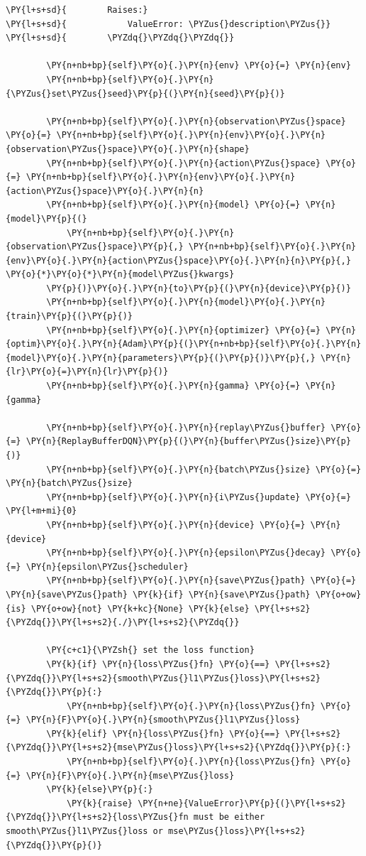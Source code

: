 \documentclass{article}
\begin{document}
\begin{Verbatim}[commandchars=\\\{\}]
\PY{l+s+sd}{        Raises:}
\PY{l+s+sd}{            ValueError: \PYZus{}description\PYZus{}}
\PY{l+s+sd}{        \PYZdq{}\PYZdq{}\PYZdq{}}

        \PY{n+nb+bp}{self}\PY{o}{.}\PY{n}{env} \PY{o}{=} \PY{n}{env}
        \PY{n+nb+bp}{self}\PY{o}{.}\PY{n}{\PYZus{}set\PYZus{}seed}\PY{p}{(}\PY{n}{seed}\PY{p}{)}

        \PY{n+nb+bp}{self}\PY{o}{.}\PY{n}{observation\PYZus{}space} \PY{o}{=} \PY{n+nb+bp}{self}\PY{o}{.}\PY{n}{env}\PY{o}{.}\PY{n}{observation\PYZus{}space}\PY{o}{.}\PY{n}{shape}
        \PY{n+nb+bp}{self}\PY{o}{.}\PY{n}{action\PYZus{}space} \PY{o}{=} \PY{n+nb+bp}{self}\PY{o}{.}\PY{n}{env}\PY{o}{.}\PY{n}{action\PYZus{}space}\PY{o}{.}\PY{n}{n}
        \PY{n+nb+bp}{self}\PY{o}{.}\PY{n}{model} \PY{o}{=} \PY{n}{model}\PY{p}{(}
            \PY{n+nb+bp}{self}\PY{o}{.}\PY{n}{observation\PYZus{}space}\PY{p}{,} \PY{n+nb+bp}{self}\PY{o}{.}\PY{n}{env}\PY{o}{.}\PY{n}{action\PYZus{}space}\PY{o}{.}\PY{n}{n}\PY{p}{,} \PY{o}{*}\PY{o}{*}\PY{n}{model\PYZus{}kwargs}
        \PY{p}{)}\PY{o}{.}\PY{n}{to}\PY{p}{(}\PY{n}{device}\PY{p}{)}
        \PY{n+nb+bp}{self}\PY{o}{.}\PY{n}{model}\PY{o}{.}\PY{n}{train}\PY{p}{(}\PY{p}{)}
        \PY{n+nb+bp}{self}\PY{o}{.}\PY{n}{optimizer} \PY{o}{=} \PY{n}{optim}\PY{o}{.}\PY{n}{Adam}\PY{p}{(}\PY{n+nb+bp}{self}\PY{o}{.}\PY{n}{model}\PY{o}{.}\PY{n}{parameters}\PY{p}{(}\PY{p}{)}\PY{p}{,} \PY{n}{lr}\PY{o}{=}\PY{n}{lr}\PY{p}{)}
        \PY{n+nb+bp}{self}\PY{o}{.}\PY{n}{gamma} \PY{o}{=} \PY{n}{gamma}

        \PY{n+nb+bp}{self}\PY{o}{.}\PY{n}{replay\PYZus{}buffer} \PY{o}{=} \PY{n}{ReplayBufferDQN}\PY{p}{(}\PY{n}{buffer\PYZus{}size}\PY{p}{)}
        \PY{n+nb+bp}{self}\PY{o}{.}\PY{n}{batch\PYZus{}size} \PY{o}{=} \PY{n}{batch\PYZus{}size}
        \PY{n+nb+bp}{self}\PY{o}{.}\PY{n}{i\PYZus{}update} \PY{o}{=} \PY{l+m+mi}{0}
        \PY{n+nb+bp}{self}\PY{o}{.}\PY{n}{device} \PY{o}{=} \PY{n}{device}
        \PY{n+nb+bp}{self}\PY{o}{.}\PY{n}{epsilon\PYZus{}decay} \PY{o}{=} \PY{n}{epsilon\PYZus{}scheduler}
        \PY{n+nb+bp}{self}\PY{o}{.}\PY{n}{save\PYZus{}path} \PY{o}{=} \PY{n}{save\PYZus{}path} \PY{k}{if} \PY{n}{save\PYZus{}path} \PY{o+ow}{is} \PY{o+ow}{not} \PY{k+kc}{None} \PY{k}{else} \PY{l+s+s2}{\PYZdq{}}\PY{l+s+s2}{./}\PY{l+s+s2}{\PYZdq{}}

        \PY{c+c1}{\PYZsh{} set the loss function}
        \PY{k}{if} \PY{n}{loss\PYZus{}fn} \PY{o}{==} \PY{l+s+s2}{\PYZdq{}}\PY{l+s+s2}{smooth\PYZus{}l1\PYZus{}loss}\PY{l+s+s2}{\PYZdq{}}\PY{p}{:}
            \PY{n+nb+bp}{self}\PY{o}{.}\PY{n}{loss\PYZus{}fn} \PY{o}{=} \PY{n}{F}\PY{o}{.}\PY{n}{smooth\PYZus{}l1\PYZus{}loss}
        \PY{k}{elif} \PY{n}{loss\PYZus{}fn} \PY{o}{==} \PY{l+s+s2}{\PYZdq{}}\PY{l+s+s2}{mse\PYZus{}loss}\PY{l+s+s2}{\PYZdq{}}\PY{p}{:}
            \PY{n+nb+bp}{self}\PY{o}{.}\PY{n}{loss\PYZus{}fn} \PY{o}{=} \PY{n}{F}\PY{o}{.}\PY{n}{mse\PYZus{}loss}
        \PY{k}{else}\PY{p}{:}
            \PY{k}{raise} \PY{n+ne}{ValueError}\PY{p}{(}\PY{l+s+s2}{\PYZdq{}}\PY{l+s+s2}{loss\PYZus{}fn must be either smooth\PYZus{}l1\PYZus{}loss or mse\PYZus{}loss}\PY{l+s+s2}{\PYZdq{}}\PY{p}{)}


\end{Verbatim}
\end{document}
